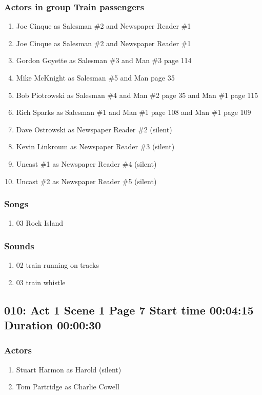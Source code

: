 \subsubsection{Actors in group Train passengers}
\begin{enumerate}
\item Joe Cinque as Salesman \#2 and Newspaper Reader \#1
\item Joe Cinque as Salesman \#2 and Newspaper Reader \#1
\item Gordon Goyette as Salesman \#3 and Man \#3 page 114
\item Mike McKnight as Salesman \#5 and Man page 35
\item Bob Piotrowski as Salesman \#4 and Man \#2 page 35 and Man \#1 page 115
\item Rich Sparks as Salesman \#1 and Man \#1 page 108 and Man \#1 page 109
\item Dave Ostrowski as Newspaper Reader \#2 (silent)
\item Kevin Linkroum as Newspaper Reader \#3 (silent)
\item Uncast \#1 as Newspaper Reader \#4 (silent)
\item Uncast \#2 as Newspaper Reader \#5 (silent)
\end{enumerate}

\subsubsection{Songs}
\begin{enumerate}
\item 03 Rock Island
\end{enumerate}\subsubsection{Sounds}
\begin{enumerate}
\item 02 train running on tracks
\item 03 train whistle
\end{enumerate}
\subsection{010: Act 1 Scene 1 Page 7 Start time 00:04:15 Duration 00:00:30}

\subsubsection{Actors}
\begin{enumerate}
\item Stuart Harmon as Harold (silent)
\item Tom Partridge as Charlie Cowell
\end{enumerate}
